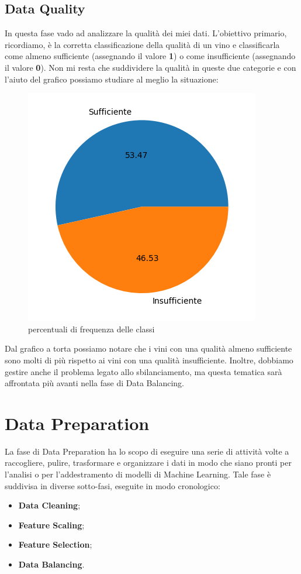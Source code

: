 \documentclass{article}
\begin{document}
\begin{titlepage}
        \newpage
        \subsection{Data Quality}
        In questa fase vado ad analizzare la qualità dei miei dati.
        L'obiettivo primario, ricordiamo, è la corretta classificazione della qualità di un vino e classificarla come almeno sufficiente (assegnando il valore \textbf{1}) o come insufficiente (assegnando il valore \textbf{0}). Non mi resta che suddividere la qualità in queste due categorie e con l'aiuto del grafico possiamo studiare al meglio la situazione:

        \begin{figure}[ht]
            \centering
            \includegraphics[width=0.5\linewidth]{pie-quality.png}
            \caption{  percentuali di frequenza delle classi}
            \label{fig:enter-label}
        \end{figure}

        Dal grafico a torta possiamo notare che i vini con una qualità almeno sufficiente sono molti di più rispetto ai vini con una qualità insufficiente.        
        Inoltre, dobbiamo gestire anche il problema legato allo sbilanciamento, ma questa tematica sarà affrontata più avanti nella fase di Data Balancing.

        \section{Data Preparation}
        La fase di Data Preparation ha lo scopo di eseguire una serie di attività volte a raccogliere, pulire, trasformare e organizzare i dati in modo che siano pronti per l'analisi o per l'addestramento di modelli di Machine Learning.
        Tale fase è suddivisa in diverse sotto-fasi, eseguite in modo cronologico:
        \begin{itemize}
            \item \textbf{Data Cleaning};
            \item \textbf{Feature Scaling};
            \item \textbf{Feature Selection};
            \item \textbf{Data Balancing}.
        \end{itemize}


\end{titlepage}
\end{document}
